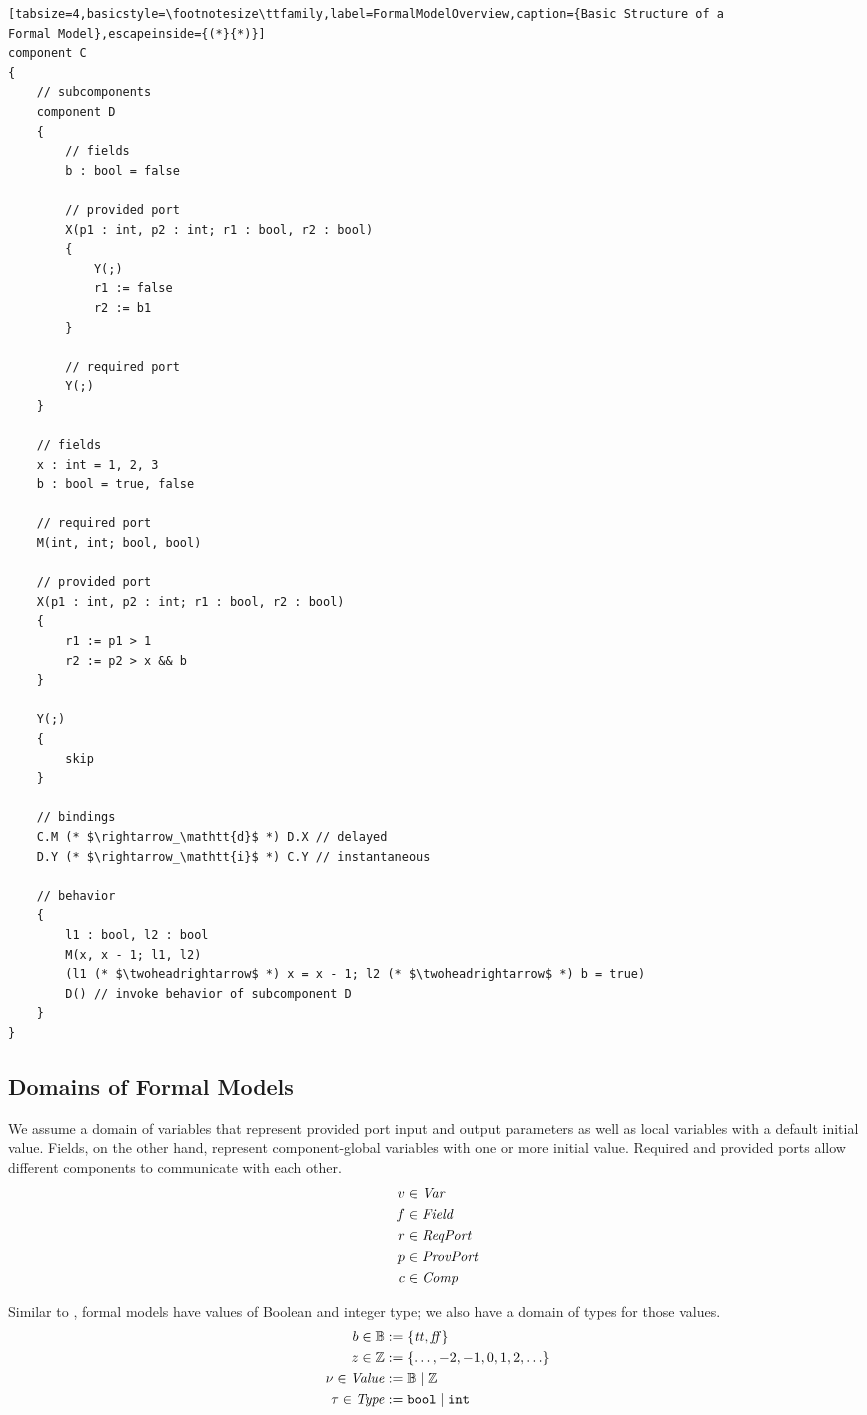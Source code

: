 \documentclass[a4paper,10pt,english]{article}
\begin{document}
\begin{lstlisting}[tabsize=4,basicstyle=\footnotesize\ttfamily,label=FormalModelOverview,caption={Basic Structure of a
Formal Model},escapeinside={(*}{*)}]
component C
{
	// subcomponents
	component D
	{
		// fields
		b : bool = false
			 
		// provided port
		X(p1 : int, p2 : int; r1 : bool, r2 : bool)
		{
			Y(;)
			r1 := false
			r2 := b1
		}
				
		// required port
		Y(;)
	}

	// fields
	x : int = 1, 2, 3
	b : bool = true, false
		
	// required port
	M(int, int; bool, bool)
		
	// provided port
	X(p1 : int, p2 : int; r1 : bool, r2 : bool)
	{
		r1 := p1 > 1
		r2 := p2 > x && b
	}	
	
	Y(;)
	{
		skip
	}
		
	// bindings
	C.M (* $\rightarrow_\mathtt{d}$ *) D.X // delayed
	D.Y (* $\rightarrow_\mathtt{i}$ *) C.Y // instantaneous
	
	// behavior
	{
		l1 : bool, l2 : bool
		M(x, x - 1; l1, l2)
		(l1 (* $\twoheadrightarrow$ *) x = x - 1; l2 (* $\twoheadrightarrow$ *) b = true)
		D() // invoke behavior of subcomponent D
	}
}
\end{lstlisting}

\subsection{Domains of Formal Models}
We assume a domain of variables that represent provided port input and output parameters as well as local variables with a default
initial value. Fields, on the other hand, represent component-global variables with one or more initial value. Required and
provided ports allow different components to communicate with each other.
\begin{align*}
	v &\in \mathit{Var} \\
	f &\in \mathit{Field} \\
	r &\in \mathit{ReqPort} \\
	p &\in \mathit{ProvPort} \\
	c&\in \mathit{Comp}
\end{align*}

Similar to \Fil, formal models have values of Boolean and integer type; we also have a domain of types
for those values.
\begin{align*}
    b \in \mathbb{B} &:= \{ \mathit{tt}, \mathit{ff} \}
    \\
    z \in \mathbb{Z} &:= \{ \ldots, -2, -1, 0, 1, 2, \ldots \}
    \\
    \nu \in \mathit{Value} &:= \mathbb{B} \mid \mathbb{Z}
    \\
	\tau \in \mathit{Type} &:= \mathtt{bool} \mid \mathtt{int}
\end{align*}
\end{document}
